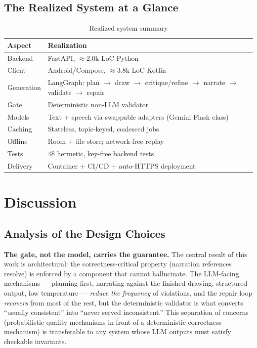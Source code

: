 \subsection{The Realized System at a Glance}

\begin{table}[htbp]
\caption{Realized system summary}
\label{tab:summary}
\centering
\small
\renewcommand{\arraystretch}{1.3}
\begin{tabular}{@{}ll@{}}
\toprule
\textbf{Aspect} & \textbf{Realization}\\
\midrule
Backend & FastAPI, $\approx$2.0k LoC Python\\
Client & Android/Compose, $\approx$3.8k LoC Kotlin\\
Generation & LangGraph: plan $\to$ draw $\to$ critique/refine $\to$ narrate
$\to$ validate $\to$ repair\\
Gate & Deterministic non-LLM validator\\
Models & Text + speech via swappable adapters (Gemini Flash class)\\
Caching & Stateless, topic-keyed, coalesced jobs\\
Offline & Room + file store; network-free replay\\
Tests & 48 hermetic, key-free backend tests\\
Delivery & Container + CI/CD + auto-HTTPS deployment\\
\bottomrule
\end{tabular}
\end{table}

\section{Discussion}
\label{sec:discussion}

\subsection{Analysis of the Design Choices}

\textbf{The gate, not the model, carries the guarantee.} The central result
of this work is architectural: the correctness-critical property (narration
references resolve) is enforced by a component that cannot hallucinate. The
LLM-facing mechanisms --- planning first, narrating against the finished
drawing, structured output, low temperature --- \emph{reduce the frequency}
of violations, and the repair loop \emph{recovers} from most of the rest,
but the deterministic validator is what converts ``usually consistent'' into
``never served inconsistent.'' This separation of concerns (probabilistic
quality mechanisms in front of a deterministic correctness mechanism) is
transferable to any system whose LLM outputs must satisfy checkable
invariants.

